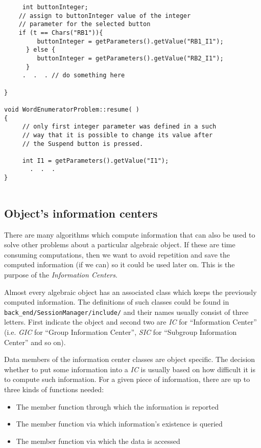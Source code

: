 \documentclass[12pt]{article}
\begin{document}
\begin{verbatim}
     int buttonInteger;
    // assign to buttonInteger value of the integer
    // parameter for the selected button
    if (t == Chars("RB1")){
         buttonInteger = getParameters().getValue("RB1_I1");
      } else {
         buttonInteger = getParameters().getValue("RB2_I1");
      }
     .  .  . // do something here

}

void WordEnumeratorProblem::resume( )
{
     // only first integer parameter was defined in a such
     // way that it is possible to change its value after
     // the Suspend button is pressed.

     int I1 = getParameters().getValue("I1");
       .  .  .
}


    \end{verbatim}
    \normalsize



\subsection{Object's information centers}

There are many  algorithms which compute  information that can also
be used to solve other problems about a particular algebraic object.
If these are time consuming computations, then we want to avoid repetition
and save the computed information (if we can) so it could be used
later on. 
This is the purpose of the {\em Information Centers}.

Almost every algebraic object has an associated class  which
keeps the previously computed information. The definitions of such classes
could
be found in {\tt back\_end/SessionManager/include/} and their names
usually consist
of three letters. First indicate the object and second two are {\em IC}
for 
``Information Center'' (i.e. {\em GIC} for ``Group Information Center'',
{\em SIC}
for ``Subgroup Information Center'' and so on).

Data members of the information center classes are   object specific. The
decision
whether to put some information into a {\em IC}  is usually 
 based on how difficult it is to compute such information. 
 For a given piece of information, there are up to three kinds of
functions needed:
\begin{itemize}
\item The member function through which the information is reported 
\item The member function via which information's existence is queried 
\item The member function via which the data is accessed
\end{itemize}
\end{document}
